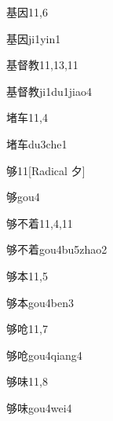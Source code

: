 \begin{entry}{基因}{11,6}
  \begin{phonetics}{基因}{ji1yin1}
  \end{phonetics}
\end{entry}

\begin{entry}{基督教}{11,13,11}
  \begin{phonetics}{基督教}{ji1du1jiao4}
  \end{phonetics}
\end{entry}

\begin{entry}{堵车}{11,4}
  \begin{phonetics}{堵车}{du3che1}
  \end{phonetics}
\end{entry}

\begin{entry}{够}{11}[Radical ⼣]
  \begin{phonetics}{够}{gou4}
  \end{phonetics}
\end{entry}

\begin{entry}{够不着}{11,4,11}
  \begin{phonetics}{够不着}{gou4bu5zhao2}
  \end{phonetics}
\end{entry}

\begin{entry}{够本}{11,5}
  \begin{phonetics}{够本}{gou4ben3}
  \end{phonetics}
\end{entry}

\begin{entry}{够呛}{11,7}
  \begin{phonetics}{够呛}{gou4qiang4}
  \end{phonetics}
\end{entry}

\begin{entry}{够味}{11,8}
  \begin{phonetics}{够味}{gou4wei4}
  \end{phonetics}
\end{entry}

